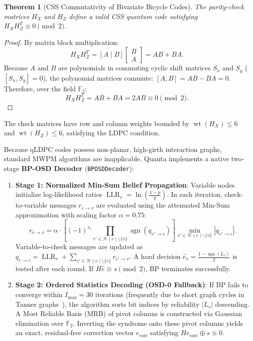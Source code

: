 \documentclass[aps,prx,twocolumn,superscriptaddress,nofootinbib]{revtex4-2}
\newcommand{\sgn}{\operatorname{sgn}}
\newcommand{\LLR}{\operatorname{LLR}}
\newtheorem{theorem}{Theorem}
\begin{document}
\begin{theorem}[CSS Commutativity of Bivariate Bicycle Codes]
The parity-check matrices $H_X$ and $H_Z$ define a valid CSS quantum code satisfying $H_X H_Z^T \equiv 0 \pmod 2$.
\end{theorem}

\begin{proof}
By matrix block multiplication:
\begin{equation}
    H_X H_Z^T = [A \mid B] \begin{bmatrix} B \\ A \end{bmatrix} = A B + B A.
\end{equation}
Because $A$ and $B$ are polynomials in commuting cyclic shift matrices $S_x$ and $S_y$ ($[S_x, S_y] = 0$), the polynomial matrices commute: $[A, B] = A B - B A = 0$. Therefore, over the field $\mathbb{F}_2$:
\begin{equation}
    H_X H_Z^T = A B + B A = 2 A B \equiv 0 \pmod 2.
\end{equation}
\end{proof}

The check matrices have row and column weights bounded by $\operatorname{wt}(H_X) \le 6$ and $\operatorname{wt}(H_Z) \le 6$, satisfying the LDPC condition.

Because qLDPC codes possess non-planar, high-girth interaction graphs, standard MWPM algorithms are inapplicable. Quanta implements a native two-stage \textbf{BP-OSD Decoder} (\texttt{BPOSDDecoder}):

\begin{enumerate}
    \item \textbf{Stage 1: Normalized Min-Sum Belief Propagation}:
    Variable nodes initialize log-likelihood ratios $\LLR_v = \ln\left(\frac{1-p}{p}\right)$. In each iteration, check-to-variable messages $r_{c \to v}$ are evaluated using the attenuated Min-Sum approximation with scaling factor $\alpha = 0.75$:
    \begin{equation}
        r_{c \to v} = \alpha \cdot \left[ (-1)^{s_c} \prod_{v' \in \mathcal{N}(c) \setminus \{v\}} \sgn(q_{v' \to c}) \right] \min_{v' \in \mathcal{N}(c) \setminus \{v\}} |q_{v' \to c}|.
    \end{equation}
    Variable-to-check messages are updated as $q_{v \to c} = \LLR_v + \sum_{c' \in \mathcal{N}(v) \setminus \{c\}} r_{c' \to v}$. A hard decision $\hat{e}_v = \frac{1 - \sgn(L_v)}{2}$ is tested after each round. If $H \hat{e} \equiv s \pmod 2$, BP terminates successfully.
    \item \textbf{Stage 2: Ordered Statistics Decoding (OSD-0 Fallback)}:
    If BP fails to converge within $I_{\text{max}} = 30$ iterations (frequently due to short graph cycles in Tanner graphs~\cite{roffe2020decoding}), the algorithm sorts bit indices by reliability $|L_v|$ descending. A Most Reliable Basis (MRB) of pivot columns is constructed via Gaussian elimination over $\mathbb{F}_2$. Inverting the syndrome onto these pivot columns yields an exact, residual-free correction vector $e_{\text{corr}}$ satisfying $H e_{\text{corr}} \oplus s \equiv 0$.
\end{enumerate}
\end{document}
